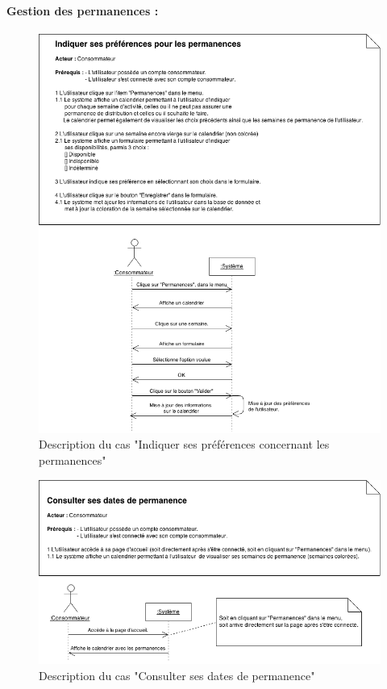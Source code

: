 \documentclass[12pt]{report}
\begin{document}
\paragraph*{Gestion des permanences :}

\begin{figure}[!h]
\centering
\includegraphics[width=1.\textwidth]{./ressources/desc_UC_preferences_calendrier.png}
\caption{Description du cas "Indiquer ses préférences concernant les permanences"}
\end{figure}
\clearpage

\begin{figure}[!h]
\centering
\includegraphics[width=1.\textwidth]{./ressources/desc_UC_consulter_permanences.png}
\caption{Description du cas "Consulter ses dates de permanence"}
\end{figure}
\clearpage
\end{document}
